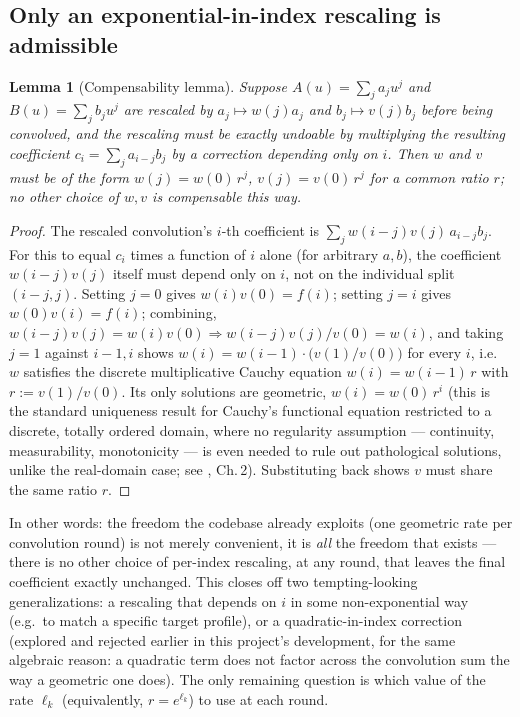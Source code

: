 \documentclass[11pt]{article}
\newtheorem{lemma}{Lemma}
\begin{document}
\subsection{Only an exponential-in-index rescaling is admissible}

\begin{lemma}[Compensability lemma]
\label{lem:compensability}
Suppose $A(u) = \sum_j a_j u^j$ and $B(u) = \sum_j b_j u^j$ are rescaled by
$a_j \mapsto w(j) a_j$ and $b_j \mapsto v(j) b_j$ before being convolved, and the
rescaling must be exactly undoable by multiplying the resulting coefficient
$c_i = \sum_j a_{i-j} b_j$ by a correction depending only on $i$. Then $w$ and $v$ must
be of the form $w(j) = w(0)\,r^{j}$, $v(j) = v(0)\, r^{j}$ for a common ratio $r$; no
other choice of $w,v$ is compensable this way.
\end{lemma}
\begin{proof}
The rescaled convolution's $i$-th coefficient is $\sum_j w(i-j)v(j)\,a_{i-j}b_j$. For this
to equal $c_i$ times a function of $i$ alone (for arbitrary $a,b$), the coefficient
$w(i-j)v(j)$ itself must depend only on $i$, not on the individual split $(i-j,j)$.
Setting $j=0$ gives $w(i)v(0) = f(i)$; setting $j=i$ gives $w(0)v(i)=f(i)$; combining,
$w(i-j)v(j) = w(i)v(0) \Rightarrow w(i-j)v(j)/v(0) = w(i)$, and taking $j=1$ against
$i-1,i$ shows $w(i) = w(i-1)\cdot\big(v(1)/v(0)\big)$ for every $i$, i.e.\ $w$ satisfies
the discrete multiplicative Cauchy equation $w(i) = w(i-1)\,r$ with
$r := v(1)/v(0)$. Its only solutions are geometric, $w(i) = w(0)\,r^{i}$ (this is the
standard uniqueness result for Cauchy's functional equation restricted to a discrete,
totally ordered domain, where no regularity assumption --- continuity, measurability,
monotonicity --- is even needed to rule out pathological solutions, unlike the
real-domain case; see \citet{aczel1966}, Ch.\,2). Substituting back shows $v$ must share
the same ratio $r$.
\end{proof}

In other words: the freedom the codebase already exploits (one geometric rate per
convolution round) is not merely convenient, it is \emph{all} the freedom that
exists --- there is no other choice of per-index rescaling, at any round, that leaves
the final coefficient exactly unchanged. This closes off two tempting-looking
generalizations: a rescaling that depends on $i$ in some non-exponential way (e.g.\ to
match a specific target profile), or a quadratic-in-index correction (explored and
rejected earlier in this project's development, for the same algebraic reason: a
quadratic term does not factor across the convolution sum the way a geometric one
does). The only remaining question is which value of the rate $\ell_k$ (equivalently,
$r=e^{\ell_k}$) to use at each round.
\end{document}
